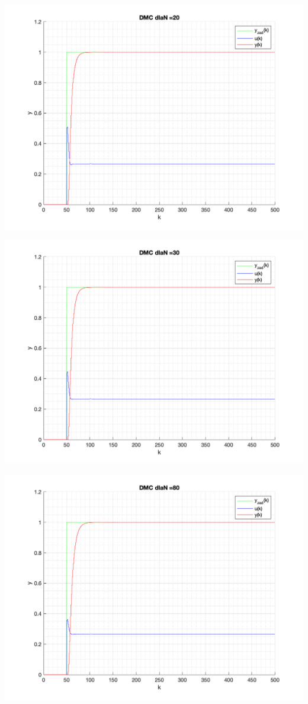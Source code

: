 \documentclass[a4paper, 11pt]{article}
\begin{document}
\begin{enumerate}
 \includegraphics[width=\linewidth]{./ModelsP4_N/P4_DMC_N_20_png.png} 
 
 \includegraphics[width=\linewidth]{./ModelsP4_N/P4_DMC_N_30_png.png} 
 
 \includegraphics[width=\linewidth]{./ModelsP4_N/P4_DMC_N_80_png.png} 
 

\end{enumerate}
\end{document}
